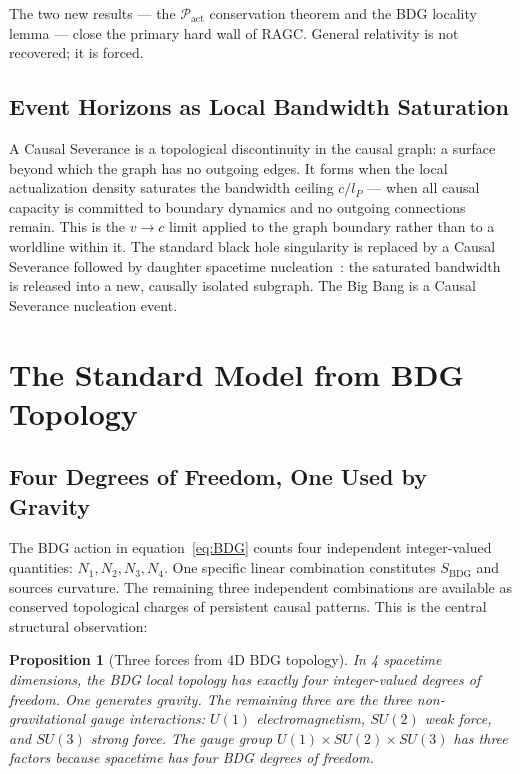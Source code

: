 \documentclass[11pt,a4paper]{article}
\newtheorem{proposition}[theorem]{Proposition}
\newcommand{\SBDG}{S_{\mathrm{BDG}}}
\newcommand{\Pact}{\mathcal{P}_{\mathrm{act}}}
\begin{document}
The two new results --- the $\Pact$ conservation theorem and the BDG
locality lemma --- close the primary hard wall of RAGC. General
relativity is not recovered; it is forced.

\subsection{Event Horizons as Local Bandwidth Saturation}

A Causal Severance is a topological discontinuity in the causal graph:
a surface beyond which the graph has no outgoing edges. It forms when
the local actualization density saturates the bandwidth ceiling $c/l_P$
--- when all causal capacity is committed to boundary dynamics and no
outgoing connections remain. This is the $v \to c$ limit applied to
the graph boundary rather than to a worldline within it. The standard
black hole singularity is replaced by a Causal Severance followed by
daughter spacetime nucleation~\citep{Sandeman2026RAGC}: the saturated
bandwidth is released into a new, causally isolated subgraph. The
Big Bang is a Causal Severance nucleation event.

\section{The Standard Model from BDG Topology}
\label{sec:SM}

\subsection{Four Degrees of Freedom, One Used by Gravity}

The BDG action in equation~\eqref{eq:BDG} counts four independent
integer-valued quantities: $N_1, N_2, N_3, N_4$. One specific linear
combination constitutes $\SBDG$ and sources curvature. The remaining
three independent combinations are available as conserved topological
charges of persistent causal patterns. This is the central structural
observation:

\begin{proposition}[Three forces from 4D BDG topology]
\label{prop:three_forces}
In 4 spacetime dimensions, the BDG local topology has exactly four
integer-valued degrees of freedom. One generates gravity. The remaining
three are the three non-gravitational gauge interactions:
$U(1)$ electromagnetism, $SU(2)$ weak force, and $SU(3)$ strong force.
The gauge group $U(1)\times SU(2)\times SU(3)$ has three factors because
spacetime has four BDG degrees of freedom.
\end{proposition}
\end{document}
